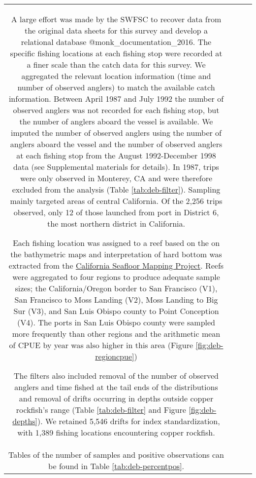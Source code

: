 \documentclass[11pt,
  letterpaper,
]{article}
\begin{document}
\begin{longtable}[t]{c>{\centering\arraybackslash}p{2cm}>{\centering\arraybackslash}p{2cm}>{\centering\arraybackslash}p{2cm}}
A large effort was made by the SWFSC to recover data from the original data sheets for this survey and develop a relational database @monk\_documentation\_2016. The specific fishing locations at each fishing stop were recorded at a finer scale than the catch data for this survey. We aggregated the relevant location information (time and number of observed anglers) to match the available catch information. Between April 1987 and July 1992 the number of observed anglers was not recorded for each fishing stop, but the number of anglers aboard the vessel is available. We imputed the number of observed anglers using the number of anglers aboard the vessel and the number of observed anglers at each fishing stop from the August 1992-December 1998 data (see Supplemental materials for details). In 1987, trips were only observed in Monterey, CA and were therefore excluded from the analysis (Table \ref{tab:deb-filter}). Sampling mainly targeted areas of central California. Of the 2,256 trips observed, only 12 of those launched from port in District 6, the most northern district in California.

Each fishing location was assigned to a reef based on the on the bathymetric maps and interpretation of hard bottom was extracted from the \href{http://seafloor.otterlabs.org/index.html}{California Seafloor Mapping Project}. Reefs were aggregated to four regions to produce adequate sample sizes; the California/Oregon border to San Francisco (V1), San Francisco to Moss Landing (V2), Moss Landing to Big Sur (V3), and San Luis Obispo county to Point Conception (V4). The ports in San Luis Obispo county were sampled more frequently than other regions and the arithmetic mean of CPUE by year was also higher in this area (Figure \ref{fig:deb-regioncpue})

The filters also included removal of the number of observed anglers and time fished at the tail ends of the distributions and removal of drifts occurring in depths outside copper rockfish's range (Table \ref{tab:deb-filter} and Figure \ref{fig:deb-depths}). We retained 5,546 drifts for index standardization, with 1,389 fishing locations encountering copper rockfish.\\
Tables of the number of samples and positive observations can be found in Table \ref{tab:deb-percentpos}.


\end{longtable}
\end{document}
